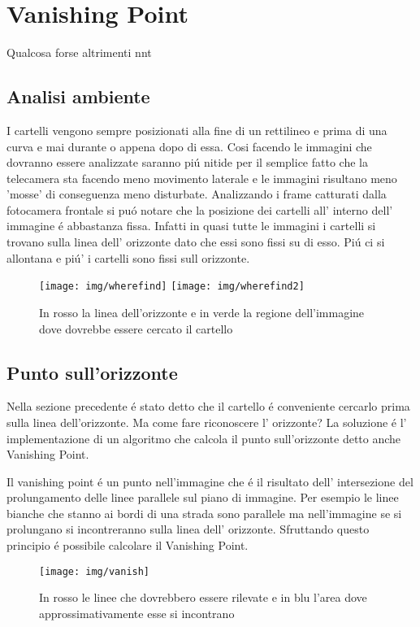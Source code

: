 \section{Vanishing Point}

	Qualcosa forse altrimenti nnt

	\subsection{Analisi ambiente}

		I cartelli vengono sempre posizionati alla fine di un rettilineo e prima di una curva e mai durante o appena dopo di essa. Cosi facendo le immagini che dovranno essere analizzate saranno pi\'u nitide per il semplice fatto che la telecamera sta facendo meno movimento laterale e le immagini risultano meno 'mosse' di conseguenza meno disturbate.\newline
		Analizzando i frame catturati dalla fotocamera frontale si pu\'o notare che la posizione dei cartelli all' interno dell' immagine \'e abbastanza fissa. Infatti in quasi tutte le immagini i cartelli si trovano sulla linea dell' orizzonte dato che essi sono fissi su di esso. Pi\'u ci si allontana e pi\'u' i cartelli sono fissi sull orizzonte.
		\begin{figure}[!ht]
			\centering
			\texttt{[image: img/wherefind]}
			\texttt{[image: img/wherefind2]}
			\caption{In rosso la linea dell'orizzonte e in verde la regione dell'immagine dove dovrebbe essere cercato il cartello}
		\end{figure}


	\subsection{Punto sull'orizzonte}

		Nella sezione precedente \'e stato detto che il cartello \'e conveniente cercarlo prima sulla linea dell'orizzonte. Ma come fare riconoscere l' orizzonte? La soluzione \'e l' implementazione di un algoritmo che calcola il punto sull'orizzonte detto anche Vanishing Point.
		
		Il vanishing point \'e un punto nell'immagine che \'e il risultato  dell' intersezione del prolungamento delle linee parallele sul piano di immagine. Per esempio le linee bianche che stanno ai bordi di una strada sono parallele ma nell'immagine se si prolungano si incontreranno sulla linea dell' orizzonte. Sfruttando questo principio \'e possibile calcolare il Vanishing Point.
		\begin{figure}[!ht]
			\centering
			\texttt{[image: img/vanish]}
			\caption{In rosso le linee che dovrebbero essere rilevate e in blu l'area dove approssimativamente esse si incontrano}
		\end{figure}

